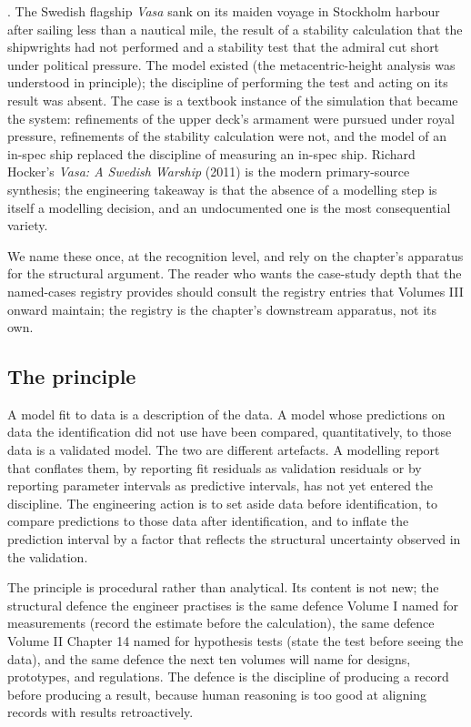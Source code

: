 . The Swedish flagship \emph{Vasa} sank on
its maiden voyage in Stockholm harbour after sailing less than a
nautical mile, the result of a stability calculation that the
shipwrights had not performed and a stability test that the
admiral cut short under political pressure. The model existed
(the metacentric-height analysis was understood in principle); the
discipline of performing the test and acting on its result was
absent. The case is a textbook instance of the simulation that
became the system: refinements of the upper deck's armament were
pursued under royal pressure, refinements of the stability
calculation were not, and the model of an in-spec ship replaced the
discipline of measuring an in-spec ship. Richard Hocker's
\emph{Vasa: A Swedish Warship} (2011) is the modern primary-source
synthesis; the engineering takeaway is that the absence of a
modelling step is itself a modelling decision, and an undocumented
one is the most consequential variety.

We name these once, at the recognition level, and rely on the
chapter's apparatus for the structural argument. The reader who
wants the case-study depth that the named-cases registry provides
should consult the registry entries that Volumes III onward
maintain; the registry is the chapter's downstream apparatus, not
its own.

\subsection{The principle}

\begin{principle}
A model fit to data is a description of the data. A model whose
predictions on data the identification did not use have been
compared, quantitatively, to those data is a validated model. The
two are different artefacts. A modelling report that conflates
them, by reporting fit residuals as validation residuals or by
reporting parameter intervals as predictive intervals, has not
yet entered the discipline. The engineering action is to set
aside data before identification, to compare predictions to those
data after identification, and to inflate the prediction interval
by a factor that reflects the structural uncertainty observed in
the validation.
\end{principle}

The principle is procedural rather than analytical. Its content
is not new; the structural defence the engineer practises is the
same defence Volume I named for measurements (record the
estimate before the calculation), the same defence Volume II
Chapter 14 named for hypothesis tests (state the test before
seeing the data), and the same defence the next ten volumes will
name for designs, prototypes, and regulations. The defence is
the discipline of producing a record before producing a result,
because human reasoning is too good at aligning records with
results retroactively.

